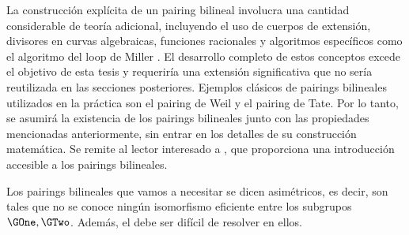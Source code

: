 La construcción explícita de un pairing bilineal involucra una cantidad considerable de teoría adicional, incluyendo el uso de cuerpos de extensión, divisores en curvas algebraicas, funciones racionales y algoritmos específicos como el algoritmo del loop de Miller \cite{miller86}. El desarrollo completo de estos conceptos excede el objetivo de esta tesis y requeriría una extensión significativa que no sería reutilizada en las secciones posteriores. Ejemplos clásicos de pairings bilineales utilizados en la práctica son el pairing de Weil y el pairing de Tate. Por lo tanto, se asumirá la existencia de los pairings bilineales junto con las propiedades mencionadas anteriormente, sin entrar en los detalles de su construcción matemática. Se remite al lector interesado a \cite{costello2010pairings}, que proporciona una introducción accesible a los pairings bilineales.

Los pairings bilineales que vamos a necesitar se dicen asimétricos, es decir, son tales que no se conoce ningún isomorfismo eficiente entre los subgrupos $\GOne,\GTwo$. Además, el \ECDLP debe ser difícil de resolver en ellos.
